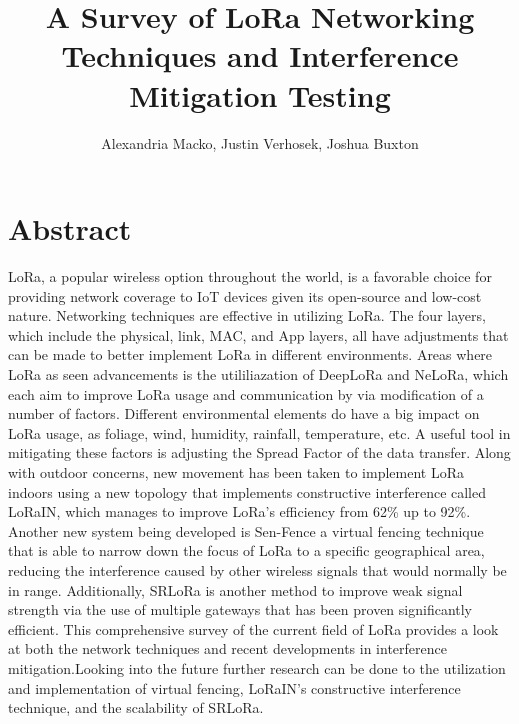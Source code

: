 \documentclass[sigsmall]{acmart}
\title{A Survey of LoRa Networking Techniques and Interference Mitigation Testing}
\author{Alexandria Macko, Justin Verhosek, Joshua Buxton}
\begin{document}
\maketitle
\section*{Abstract}
LoRa, a popular wireless option throughout the world, is a favorable choice for providing network coverage to IoT devices given its open-source and low-cost nature. Networking techniques are effective in utilizing LoRa. The four layers, which include the physical, link, MAC, and App layers, all have adjustments that can be made to better implement LoRa in different environments. Areas where LoRa as seen advancements is the utililiazation of DeepLoRa and NeLoRa, which each aim to improve LoRa usage and communication by via modification of a number of factors. Different environmental elements do have a big impact on LoRa usage, as foliage, wind, humidity, rainfall, temperature, etc. A useful tool in mitigating these factors is adjusting the Spread Factor of the data transfer. Along with outdoor concerns, new movement has been taken to implement LoRa indoors using a new topology that implements constructive interference called LoRaIN, which manages to improve LoRa’s efficiency from 62\% up to 92\%. Another new system being developed is Sen-Fence a virtual fencing technique that is able to narrow down the focus of LoRa to a specific geographical area, reducing the interference caused by other wireless signals that would normally be in range. Additionally, SRLoRa is another method to improve weak signal strength via the use of multiple gateways that has been proven significantly efficient. This comprehensive survey of the current field of LoRa provides a look at both the network techniques and recent developments in interference mitigation.Looking into the future further research can be done to the utilization and implementation of virtual fencing, LoRaIN’s constructive interference technique, and the scalability of SRLoRa.
\end{document}
